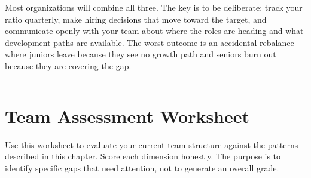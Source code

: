 \documentclass[
  a4paper,
  DIV=11,
  numbers=noendperiod]{scrreprt}
\begin{document}
Most organizations will combine all three. The key is to be deliberate:
track your ratio quarterly, make hiring decisions that move toward the
target, and communicate openly with your team about where the roles are
heading and what development paths are available. The worst outcome is
an accidental rebalance where juniors leave because they see no growth
path and seniors burn out because they are covering the gap.

\begin{center}\rule{0.5\linewidth}{0.5pt}\end{center}

\section{Team Assessment Worksheet}\label{team-assessment-worksheet}

Use this worksheet to evaluate your current team structure against the
patterns described in this chapter. Score each dimension honestly. The
purpose is to identify specific gaps that need attention, not to
generate an overall grade.
\end{document}

